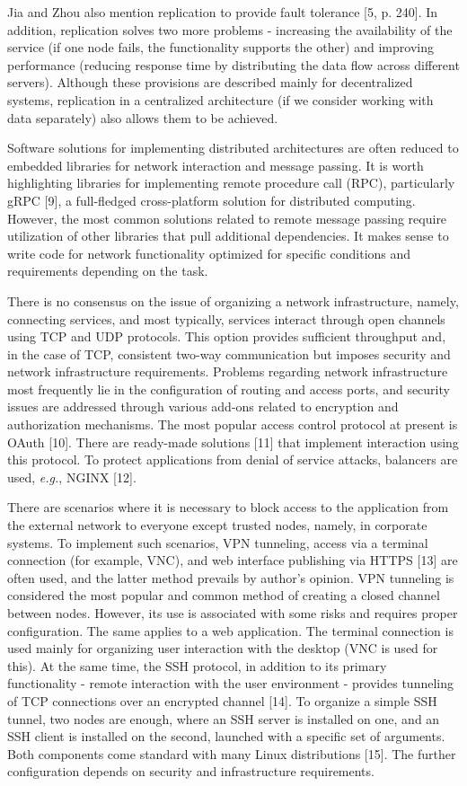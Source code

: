 \documentclass[
]{ceurart}
\begin{document}
Jia and Zhou also mention replication to provide fault tolerance [5, p. 240]. In addition, replication solves two more problems - increasing the availability of the service (if one node fails, the functionality supports the other) and improving performance (reducing response time by distributing the data flow across different servers). Although these provisions are described mainly for decentralized systems, replication in a centralized architecture (if we consider working with data separately) also allows them to be achieved.

Software solutions for implementing distributed architectures are often reduced to embedded libraries for network interaction and message passing. It is worth highlighting libraries for implementing remote procedure call (RPC), particularly gRPC [9], a full-fledged cross-platform solution for distributed computing. However, the most common solutions related to remote message passing require utilization of other libraries that pull additional dependencies. It makes sense to write code for network functionality optimized for specific conditions and requirements depending on the task.

There is no consensus on the issue of organizing a network infrastructure, namely, connecting services, and most typically, services interact through open channels using TCP and UDP protocols. This option provides sufficient throughput and, in the case of TCP, consistent two-way communication but imposes security and network infrastructure requirements. Problems regarding network infrastructure most frequently lie in the configuration of routing and access ports, and security issues are addressed through various add-ons related to encryption and authorization mechanisms. The most popular access control protocol at present is OAuth [10]. There are ready-made solutions [11] that implement interaction using this protocol. To protect applications from denial of service attacks, balancers are used, \emph{e.g.}, NGINX [12].

There are scenarios where it is necessary to block access to the application from the external network to everyone except trusted nodes, namely, in corporate systems. To implement such scenarios, VPN tunneling, access via a terminal connection (for example, VNC), and web interface publishing via HTTPS [13] are often used, and the latter method prevails by author's opinion. VPN tunneling is considered the most popular and common method of creating a closed channel between nodes. However, its use is associated with some risks and requires proper configuration. The same applies to a web application. The terminal connection is used mainly for organizing user interaction with the desktop (VNC is used for this). At the same time, the SSH protocol, in addition to its primary functionality - remote interaction with the user environment - provides tunneling of TCP connections over an encrypted channel [14]. To organize a simple SSH tunnel, two nodes are enough, where an SSH server is installed on one, and an SSH client is installed on the second, launched with a specific set of arguments. Both components come standard with many Linux distributions [15]. The further configuration depends on security and infrastructure requirements.
\end{document}
